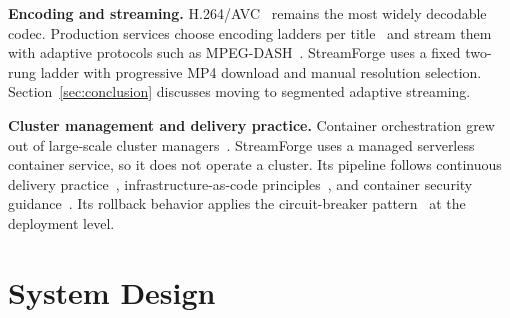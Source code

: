 \documentclass[conference]{IEEEtran}
\begin{document}
\textbf{Encoding and streaming.} H.264/AVC~\cite{wiegand2003overview} remains the most widely decodable codec. Production services choose encoding ladders per title~\cite{netflix_pertitle} and stream them with adaptive protocols such as MPEG-DASH~\cite{stockhammer2011dash}. StreamForge uses a fixed two-rung ladder with progressive MP4 download and manual resolution selection. Section~\ref{sec:conclusion} discusses moving to segmented adaptive streaming.

\textbf{Cluster management and delivery practice.} Container orchestration grew out of large-scale cluster managers~\cite{burns2016borg}. StreamForge uses a managed serverless container service, so it does not operate a cluster. Its pipeline follows continuous delivery practice~\cite{humble2010continuous}, infrastructure-as-code principles~\cite{morris2020iac}, and container security guidance~\cite{nist800190}. Its rollback behavior applies the circuit-breaker pattern~\cite{nygard2018release} at the deployment level.

\section{System Design}\label{sec:design}
\end{document}
